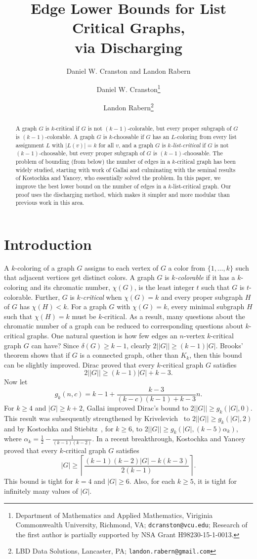 \documentclass[12pt]{article}
\title{Edge Lower Bounds for List Critical Graphs,\\ via Discharging}
\author{Daniel W. Cranston and Landon Rabern}
\author{Daniel W. Cranston\thanks{Department of Mathematics and Applied
Mathematics, Viriginia Commonwealth University, Richmond, VA;
\texttt{dcranston@vcu.edu}; 
Research of the first author is partially supported by NSA Grant
H98230-15-1-0013.}
\and
Landon Rabern\thanks{LBD Data Solutions, Lancaster, PA;
\texttt{landon.rabern@gmail.com}}
	}
\theoremstyle{plain}
\theoremstyle{definition}
\theoremstyle{remark}
\newcommand{\ceil}[1]{\left\lceil#1\right\rceil}
\begin{document}
\maketitle
\begin{abstract}
A graph $G$ is $k$-critical if $G$ is not $(k-1)$-colorable, but every proper
subgraph of $G$ is $(k-1)$-colorable.
A graph $G$ is $k$-choosable if $G$ has an $L$-coloring from every list
assignment $L$ with $|L(v)|=k$ for all $v$, and a graph $G$ is
\emph{$k$-list-critical} if $G$ is not $(k-1)$-choosable, but every
proper subgraph of $G$ is $(k-1)$-choosable.  The problem of bounding (from below)
the number of edges in a $k$-critical graph has been widely studied, starting
with work of Gallai and culminating with the seminal results of Kostochka and
Yancey, who essentially solved the problem.  In this paper, we improve the best
lower bound on the number of edges in a $k$-list-critical graph.  Our proof
uses the discharging method, which makes it simpler and more modular than previous
work in this area.
\end{abstract}

\section{Introduction}
A $k$-coloring of a graph $G$ assigns to each vertex of $G$ a color from
$\{1,\ldots,k\}$ such that adjacent vertices get distinct colors.  A graph $G$ is
\emph{$k$-colorable} if it has a $k$-coloring and its chromatic number,
$\chi(G)$, is the least integer $t$ such that $G$ is $t$-colorable.  
Further, $G$ is \emph{$k$-critical} when $\chi(G)=k$ and every proper subgraph
$H$ of $G$ has $\chi(H)<k$.  For a graph $G$ with $\chi(G)=k$, every minimal
subgraph $H$ such that $\chi(H)=k$ must be $k$-critical.  As a result, many
questions about the chromatic number of a graph can be reduced to corresponding
questions about $k$-critical graphs.  One natural question is how few edges an
$n$-vertex $k$-critical graph $G$ can have?  Since $\delta(G)\ge k-1$, clearly
$2||G|| \ge (k-1)|G|$.  Brooks' theorem shows that if $G$ is a connected graph,
other than $K_k$, then this bound can be slightly improved.  Dirac proved that
every $k$-critical graph $G$ satisfies 
$$
2||G|| \ge (k-1)|G|+k-3.
$$
Now let 
$$
g_k(n,c) = k-1 + \frac{k-3}{(k-c)(k-1)+k-3}n.
$$
For $k\ge 4$ and $|G|\ge k+2$, Gallai improved Dirac's bound to $2||G|| \ge
g_k(|G|,0)$.  This result was subsequently strengthened by
Krivelevich~\cite{krivelevich1997minimal} to $2||G||\ge g_k(|G|,2)$ and by Kostochka and
Stiebitz~\cite{kostochkastiebitzedgesincriticalgraph}, for $k\ge 6$, to $2||G||
\ge g_k(|G|,(k-5)\alpha_k)$, where $\alpha_k = \frac12-\frac1{(k-1)(k-2)}$.
In a recent breakthrough, Kostochka and Yancey~\cite{kostochkayancey2012ore}
proved that every $k$-critical graph $G$ satisfies
$$
|G| \ge \ceil{\frac{(k-1)(k-2)|G|-k(k-3)}{2(k-1)}}.
$$
This bound is tight for $k=4$ and $|G|\ge 6$.  Also, for each $k\ge 5$, it is tight
for infinitely many values of $|G|$.
\end{document}
